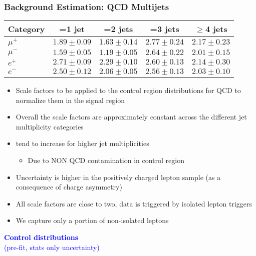 \documentclass{beamer}
\begin{document}
\begin{frame}
\frametitle{Background Estimation: QCD Multijets}
\begin{table}[htb]
\begin{center}
\begin{tabular}{ lcccc }
\hline
Category &  =1 jet & =2 jets & =3 jets & $\geq$4 jets\\
\hline
$\mu^+$ & $1.89\pm0.09$ & $1.63\pm0.14$ & $2.77\pm0.24$ & $2.17\pm0.23$ \\
$\mu^-$ & $1.59\pm0.05$ & $1.19\pm0.05$ & $2.64\pm0.22$ & $2.01\pm0.15$ \\
$e^+$ & $2.71\pm0.09$ & $2.29\pm0.10$ & $2.60\pm0.13$ & $2.14\pm0.30$ \\
$e^-$ & $2.50\pm0.12$ & $2.06\pm0.05$ & $2.56\pm0.13$ & $2.03\pm0.10$ \\
\hline
\end{tabular}
\end{center}
\end{table}
\begin{itemize}
\item Scale factors to be applied to the control region distributions for QCD to normalize them in the signal region
\item Overall the scale factors are approximately constant across the different jet multiplicity categories
\item tend to increase for higher jet multiplicities
\begin{itemize}
\item Due to NON QCD contamination in control region
\end{itemize}
\item Uncertainty is higher in the positively charged lepton sample (as a consequence of charge asymmetry)
\item All scale factors are close to two, data is triggered by isolated lepton triggers
\item We capture only a portion of non-isolated leptons
\end{itemize}
\end{frame}
\begin{frame}
\Huge{\textbf {\textcolor {blue}{Control distributions}}}\\
\Large {\textcolor{blue}{(pre-fit, stats only uncertainty)}}
\end{frame}
\end{document}
